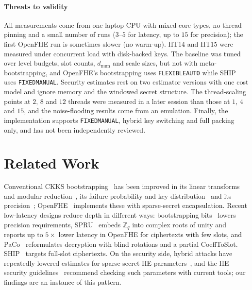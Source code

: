 \documentclass[sigconf,nonacm]{acmart}
\newcommand{\Z}{\mathbb{Z}}
\begin{document}
\paragraph{Threats to validity}
All measurements come from one laptop CPU with mixed core types, no thread pinning and a small number of runs ($3$--$5$ for latency, up to $15$ for precision); the first OpenFHE run is sometimes slower (no warm-up).
HT14 and HT15 were measured under concurrent load with disk-backed keys.
The baseline was tuned over level budgets, slot counts, $d_{\mathrm{num}}$ and scale sizes, but not with meta-bootstrapping, and OpenFHE's bootstrapping uses \texttt{FLEXIBLEAUTO} while SHIP uses \texttt{FIXEDMANUAL}.
Security estimates rest on two estimator versions with one cost model and ignore memory and the windowed secret structure.
The thread-scaling points at $2$, $8$ and $12$ threads were measured in a later session than those at $1$, $4$ and $15$, and the noise-flooding results come from an emulation.
Finally, the implementation supports \texttt{FIXEDMANUAL}, hybrid key switching and full packing only, and has not been independently reviewed.

\section{Related Work}

Conventional CKKS bootstrapping~\cite{CHKKS18} has been improved in its linear transforms and modular reduction~\cite{HK20,BMTH21}, its failure probability and key distribution~\cite{BTH22} and its precision~\cite{BCCKK22}; OpenFHE~\cite{OpenFHE22} implements these with sparse-secret encapsulation.
Recent low-latency designs reduce depth in different ways: bootstrapping bits~\cite{BCKS24} lowers precision requirements, SPRU~\cite{SPRU25} embeds $\Z_q$ into complex roots of unity and reports up to $5\times$ lower latency in OpenFHE for ciphertexts with few slots, and PaCo~\cite{PaCo25} reformulates decryption with blind rotations and a partial CoeffToSlot.
SHIP~\cite{CHKS25} targets full-slot ciphertexts.
On the security side, hybrid attacks have repeatedly lowered estimates for sparse-secret HE parameters~\cite{SC19,CP19}, and the HE security guidelines~\cite{SecGuide24} recommend checking such parameters with current tools; our findings are an instance of this pattern.

\end{document}
